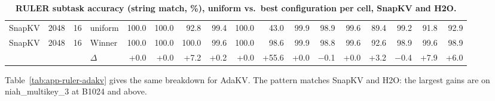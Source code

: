 \begin{table}[t]
\begin{tabular}{@{}l r r l r r r r r r r r r r r r r @{}}
    \midrule
    SnapKV & 2048 & 16 & uniform & 100.0 & 100.0 & 92.8 & 99.4 & 100.0 & 43.0 & 99.9 & 98.9 & 99.6 & 89.4 & 99.2 & 91.8 & 92.9 \\
    SnapKV & 2048 & 16 & Winner & 100.0 & 100.0 & 100.0 & 99.6 & 100.0 & 98.6 & 99.9 & 98.8 & 99.6 & 92.6 & 98.9 & 99.6 & 98.9 \\
     &  &  & $\Delta$ & +0.0 & +0.0 & +7.2 & +0.2 & +0.0 & +55.6 & +0.0 & $-$0.1 & +0.0 & +3.2 & $-$0.4 & +7.9 & +6.0 \\
    \bottomrule
  \end{tabular}
  \caption{\textbf{RULER subtask accuracy (string match, \%), uniform vs.\ best configuration per cell, SnapKV and H2O.}}
  \label{tab:app-ruler}
\end{table}


Table~\ref{tab:app-ruler-adakv} gives the same breakdown for AdaKV. The pattern matches SnapKV and H2O: the largest gains are on niah\_multikey\_3 at B1024 and above.

